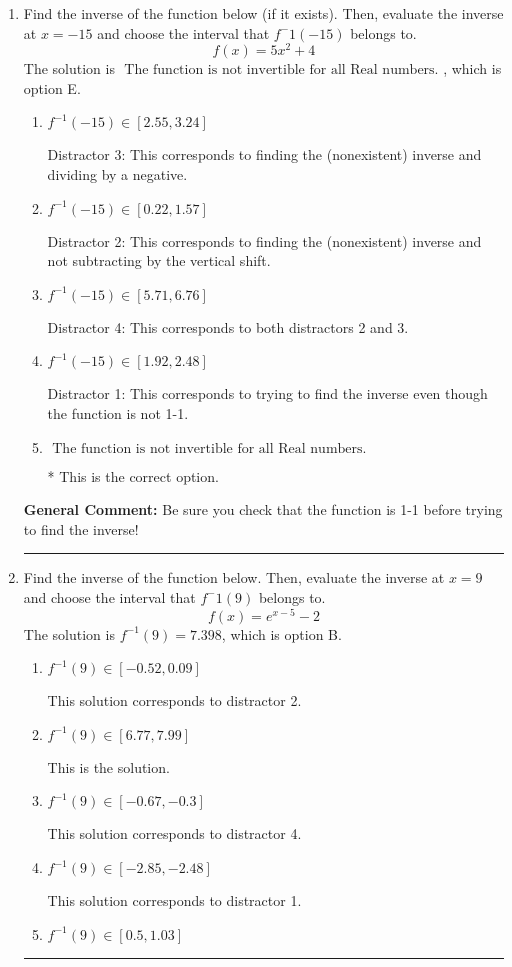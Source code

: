 \documentclass{extbook}[14pt]
\newcommand{\litem}[1]{\item #1

\rule{\textwidth}{0.4pt}}
\begin{document}
\begin{enumerate}\litem{
Find the inverse of the function below (if it exists). Then, evaluate the inverse at $x = -15$ and choose the interval that $f^-1(-15)$ belongs to.
\[ f(x) = 5 x^2 + 4 \]The solution is \( \text{ The function is not invertible for all Real numbers. } \), which is option E.\begin{enumerate}[label=\Alph*.]
\item \( f^{-1}(-15) \in [2.55, 3.24] \)

 Distractor 3: This corresponds to finding the (nonexistent) inverse and dividing by a negative.
\item \( f^{-1}(-15) \in [0.22, 1.57] \)

 Distractor 2: This corresponds to finding the (nonexistent) inverse and not subtracting by the vertical shift.
\item \( f^{-1}(-15) \in [5.71, 6.76] \)

 Distractor 4: This corresponds to both distractors 2 and 3.
\item \( f^{-1}(-15) \in [1.92, 2.48] \)

 Distractor 1: This corresponds to trying to find the inverse even though the function is not 1-1. 
\item \( \text{ The function is not invertible for all Real numbers. } \)

* This is the correct option.
\end{enumerate}

\textbf{General Comment:} Be sure you check that the function is 1-1 before trying to find the inverse!
}
\litem{
Find the inverse of the function below. Then, evaluate the inverse at $x = 9$ and choose the interval that $f^-1(9)$ belongs to.
\[ f(x) = e^{x-5}-2 \]The solution is \( f^{-1}(9) = 7.398 \), which is option B.\begin{enumerate}[label=\Alph*.]
\item \( f^{-1}(9) \in [-0.52, 0.09] \)

 This solution corresponds to distractor 2.
\item \( f^{-1}(9) \in [6.77, 7.99] \)

 This is the solution.
\item \( f^{-1}(9) \in [-0.67, -0.3] \)

 This solution corresponds to distractor 4.
\item \( f^{-1}(9) \in [-2.85, -2.48] \)

 This solution corresponds to distractor 1.
\item \( f^{-1}(9) \in [0.5, 1.03] \)


\end{enumerate}}
\end{enumerate}
\end{document}

